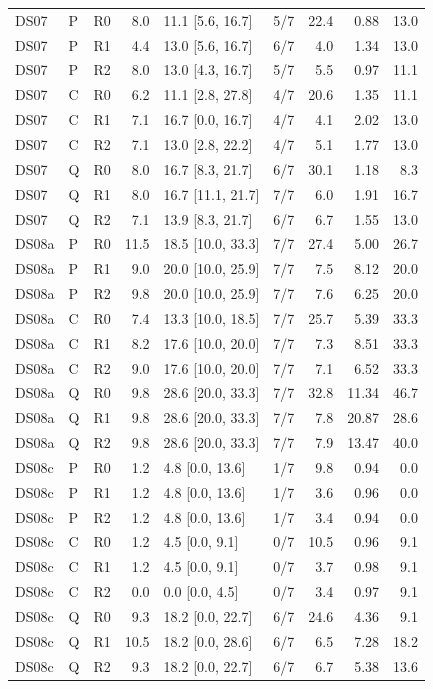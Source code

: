 \documentclass[10pt]{article}
\begin{document}
{\begin{longtable}{lllrlrrrr}
\midrule
DS07 & P & R0 & 8.0 & 11.1 [5.6, 16.7] & 5/7 & 22.4 & 0.88 & 13.0 \\
DS07 & P & R1 & 4.4 & 13.0 [5.6, 16.7] & 6/7 & 4.0 & 1.34 & 13.0 \\
DS07 & P & R2 & 8.0 & 13.0 [4.3, 16.7] & 5/7 & 5.5 & 0.97 & 11.1 \\
DS07 & C & R0 & 6.2 & 11.1 [2.8, 27.8] & 4/7 & 20.6 & 1.35 & 11.1 \\
DS07 & C & R1 & 7.1 & 16.7 [0.0, 16.7] & 4/7 & 4.1 & 2.02 & 13.0 \\
DS07 & C & R2 & 7.1 & 13.0 [2.8, 22.2] & 4/7 & 5.1 & 1.77 & 13.0 \\
DS07 & Q & R0 & 8.0 & 16.7 [8.3, 21.7] & 6/7 & 30.1 & 1.18 & 8.3 \\
DS07 & Q & R1 & 8.0 & 16.7 [11.1, 21.7] & 7/7 & 6.0 & 1.91 & 16.7 \\
DS07 & Q & R2 & 7.1 & 13.9 [8.3, 21.7] & 6/7 & 6.7 & 1.55 & 13.0 \\
\midrule
DS08a & P & R0 & 11.5 & 18.5 [10.0, 33.3] & 7/7 & 27.4 & 5.00 & 26.7 \\
DS08a & P & R1 & 9.0 & 20.0 [10.0, 25.9] & 7/7 & 7.5 & 8.12 & 20.0 \\
DS08a & P & R2 & 9.8 & 20.0 [10.0, 25.9] & 7/7 & 7.6 & 6.25 & 20.0 \\
DS08a & C & R0 & 7.4 & 13.3 [10.0, 18.5] & 7/7 & 25.7 & 5.39 & 33.3 \\
DS08a & C & R1 & 8.2 & 17.6 [10.0, 20.0] & 7/7 & 7.3 & 8.51 & 33.3 \\
DS08a & C & R2 & 9.0 & 17.6 [10.0, 20.0] & 7/7 & 7.1 & 6.52 & 33.3 \\
DS08a & Q & R0 & 9.8 & 28.6 [20.0, 33.3] & 7/7 & 32.8 & 11.34 & 46.7 \\
DS08a & Q & R1 & 9.8 & 28.6 [20.0, 33.3] & 7/7 & 7.8 & 20.87 & 28.6 \\
DS08a & Q & R2 & 9.8 & 28.6 [20.0, 33.3] & 7/7 & 7.9 & 13.47 & 40.0 \\
\midrule
DS08c & P & R0 & 1.2 & 4.8 [0.0, 13.6] & 1/7 & 9.8 & 0.94 & 0.0 \\
DS08c & P & R1 & 1.2 & 4.8 [0.0, 13.6] & 1/7 & 3.6 & 0.96 & 0.0 \\
DS08c & P & R2 & 1.2 & 4.8 [0.0, 13.6] & 1/7 & 3.4 & 0.94 & 0.0 \\
DS08c & C & R0 & 1.2 & 4.5 [0.0, 9.1] & 0/7 & 10.5 & 0.96 & 9.1 \\
DS08c & C & R1 & 1.2 & 4.5 [0.0, 9.1] & 0/7 & 3.7 & 0.98 & 9.1 \\
DS08c & C & R2 & 0.0 & 0.0 [0.0, 4.5] & 0/7 & 3.4 & 0.97 & 9.1 \\
DS08c & Q & R0 & 9.3 & 18.2 [0.0, 22.7] & 6/7 & 24.6 & 4.36 & 9.1 \\
DS08c & Q & R1 & 10.5 & 18.2 [0.0, 28.6] & 6/7 & 6.5 & 7.28 & 18.2 \\
DS08c & Q & R2 & 9.3 & 18.2 [0.0, 22.7] & 6/7 & 6.7 & 5.38 & 13.6 \\
\end{longtable}
\vspace{-0.6em}
}
\end{document}
